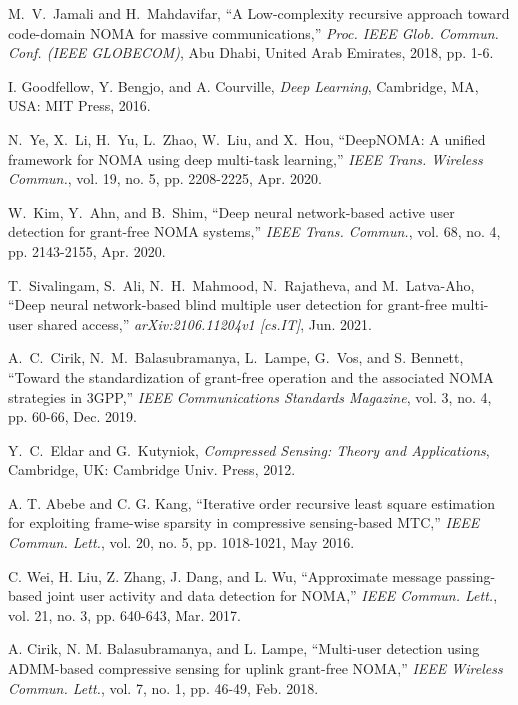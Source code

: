 \documentclass[journal]{IEEEtran}
\numberwithin{const2}{const}
\begin{document}
\begin{thebibliography}{1}
	M.~V.~Jamali and H.~Mahdavifar, 
	``A Low-complexity recursive approach toward code-domain NOMA for massive communications,''
	\emph{Proc. IEEE Glob. Commun. Conf. (IEEE GLOBECOM)},
	Abu Dhabi, United Arab Emirates, 2018, pp. 1-6.
	
	
	I. Goodfellow, Y. Bengjo, and A. Courville, 
	\emph{Deep Learning}, Cambridge, MA, USA: MIT Press, 2016.
	
	
	N.~Ye, X.~Li, H.~Yu, L.~Zhao, W.~Liu, and X.~Hou,
	``DeepNOMA: A unified framework for NOMA using deep multi-task learning,''
	\emph{IEEE Trans. Wireless Commun.}, vol. 19, no. 5, pp. 2208-2225, Apr. 2020.
	
	W.~Kim, Y.~Ahn, and B.~Shim,
	``Deep neural network-based active user detection for grant-free NOMA systems,''
	\emph{IEEE Trans. Commun.}, vol. 68, no. 4, pp. 2143-2155, Apr. 2020.
	
	T.~Sivalingam, S.~Ali, N.~H.~Mahmood, N.~Rajatheva, and M.~Latva-Aho,
	``Deep neural network-based blind multiple user detection for grant-free multi-user shared access,''
	\emph{arXiv:2106.11204v1 [cs.IT]}, Jun. 2021.	

	
	
	A.~C.~Cirik, N.~M.~Balasubramanya, L.~Lampe, G.~Vos, and S. Bennett, 
	``Toward the standardization of grant-free operation and the associated NOMA strategies in 3GPP,'' 
	\emph{IEEE Communications Standards Magazine}, vol. 3, no. 4, pp. 60-66, Dec. 2019.
	
	Y.~C.~Eldar and G.~Kutyniok,
	\emph{Compressed Sensing: Theory and Applications}, 
	Cambridge, UK: Cambridge Univ. Press, 2012. 
	
	
	A. T. Abebe and C. G. Kang,
	``Iterative order recursive least square estimation for exploiting frame-wise sparsity in compressive sensing-based MTC,''
	\emph{IEEE Commun. Lett.}, vol. 20, no. 5, pp. 1018-1021, May 2016.
	
	

	
	C. Wei, H. Liu, Z. Zhang, J. Dang, and L. Wu,
	``Approximate message passing-based joint user activity and data detection for NOMA,''
	\emph{IEEE Commun. Lett.}, vol. 21, no. 3, pp. 640-643, Mar. 2017.
	

	
	A. Cirik, N. M. Balasubramanya, and L. Lampe,
	``Multi-user detection using ADMM-based compressive sensing for uplink grant-free NOMA,''
	\emph{IEEE Wireless Commun. Lett.}, vol. 7, no. 1, pp. 46-49, Feb. 2018.
	

\end{thebibliography}
\end{document}
